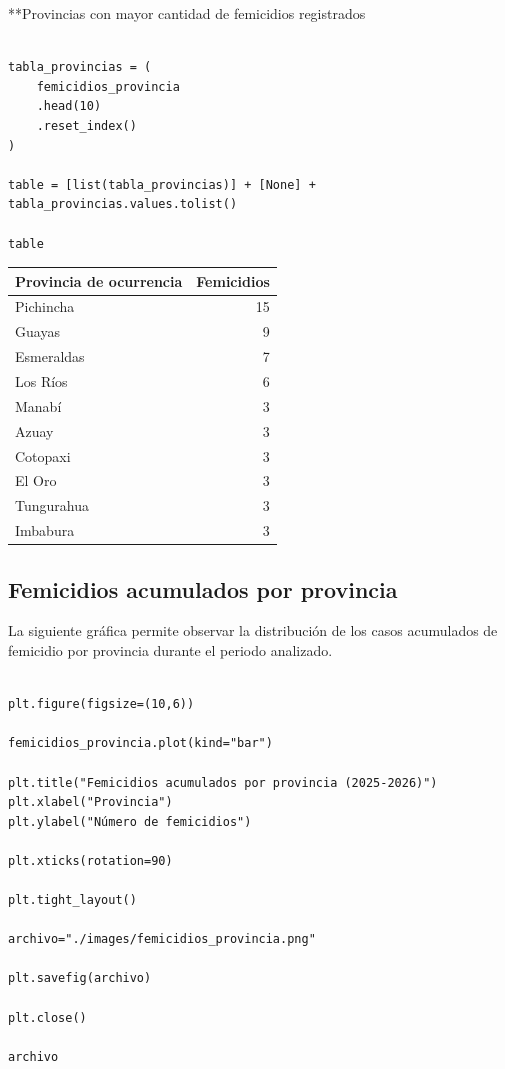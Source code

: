 \documentclass[11pt]{article}
\begin{document}
**Provincias con mayor cantidad de femicidios registrados 

\begin{verbatim}

tabla_provincias = (
    femicidios_provincia
    .head(10)
    .reset_index()
)

table = [list(tabla_provincias)] + [None] + tabla_provincias.values.tolist()

table

\end{verbatim}

\begin{center}
\begin{tabular}{lr}
Provincia de ocurrencia & Femicidios\\[0pt]
\hline
Pichincha & 15\\[0pt]
Guayas & 9\\[0pt]
Esmeraldas & 7\\[0pt]
Los Ríos & 6\\[0pt]
Manabí & 3\\[0pt]
Azuay & 3\\[0pt]
Cotopaxi & 3\\[0pt]
El Oro & 3\\[0pt]
Tungurahua & 3\\[0pt]
Imbabura & 3\\[0pt]
\end{tabular}
\end{center}

\subsection{Femicidios acumulados por provincia}
\label{sec:org873a22c}

La siguiente gráfica permite observar la distribución de los casos
acumulados de femicidio por provincia durante el periodo analizado.

\begin{verbatim}

plt.figure(figsize=(10,6))

femicidios_provincia.plot(kind="bar")

plt.title("Femicidios acumulados por provincia (2025-2026)")
plt.xlabel("Provincia")
plt.ylabel("Número de femicidios")

plt.xticks(rotation=90)

plt.tight_layout()

archivo="./images/femicidios_provincia.png"

plt.savefig(archivo)

plt.close()

archivo

\end{verbatim}
\end{document}
